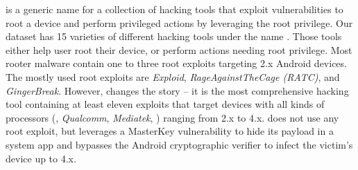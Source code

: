 
 is a generic name for a collection of
hacking tools that exploit vulnerabilities to root a device and
perform privileged actions by leveraging the root privilege.
Our dataset has 15 varieties of different hacking tools under the name .
Those tools either help user root their device, or perform
actions needing root privilege. 
Most rooter malware contain one to three root exploits targeting 2.x Android devices.
The mostly used root exploits are
{\em Exploid},
{\em RageAgainstTheCage (RATC)},
and {\em GingerBreak}.
However,  changes the story --
it is the most comprehensive hacking tool containing at least eleven exploits
that target devices with all kinds of processors (, {\em Qualcomm}, 
{\em Mediatek}, \etc) ranging from 2.x to 4.x.
 does not use any root exploit, but leverages a MasterKey 
vulnerability to hide its payload in a system app and bypasses the Android cryptographic 
verifier to infect the victim's device up to 4.x.

